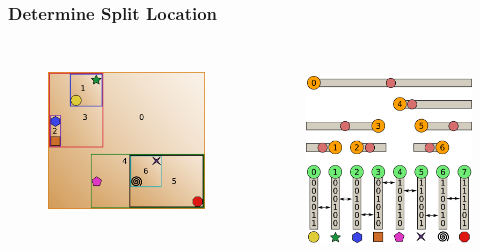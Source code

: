 \documentclass{beamer}
\begin{document}
\begin{frame}
  \frametitle{Determine Split Location}
  
\begin{columns}[t]

\begin{figure}
\includegraphics[height=45mm]{primitive-box.png}
\end{figure}

\begin{figure}
\includegraphics[height=55mm]{algo_3.png}
\end{figure}
\end{columns}
\end{frame}
\end{document}
